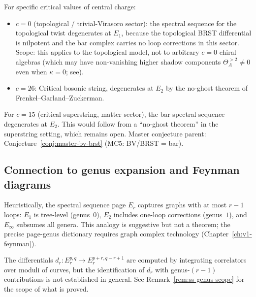 \begin{theorem}\label{thm:degeneration-special-c}
For specific critical values of central charge:
\begin{itemize}
\item $c = 0$ \textup{(topological / trivial-Virasoro sector)}: the spectral sequence
 for the topological twist degenerates at $E_1$, because the topological BRST
 differential is nilpotent and the bar complex carries no loop corrections in
 this sector. \textup{Scope}: this applies to the topological model, not to
 arbitrary $c=0$ chiral algebras (which may have non-vanishing higher shadow
 components $\Theta_A^{>2} \neq 0$ even when $\kappa = 0$; see).
\item $c = 26$: Critical bosonic string, degenerates at $E_2$ by the
 no-ghost theorem of Frenkel--Garland--Zuckerman.
\end{itemize}
\end{theorem}

\begin{conjecture}\label{conj:superstring-degeneration}
For $c = 15$ (critical superstring, matter sector), the bar spectral sequence degenerates at $E_2$. This would follow from a ``no-ghost theorem'' in the superstring setting, which remains open.
\textup{Master conjecture parent:}
Conjecture~\textup{\ref{conj:master-bv-brst}} \textup{(MC5: BV/BRST = bar).}
\end{conjecture}

\subsection{Connection to genus expansion and Feynman diagrams}

\begin{remark}\label{rem:ss-genus-spectral}
Heuristically, the spectral sequence page $E_r$ captures graphs with at most $r-1$ loops: $E_1$ is tree-level (genus~$0$), $E_2$ includes one-loop corrections (genus~$1$), and $E_\infty$ subsumes all genera. This analogy is suggestive but not a theorem; the precise page-genus dictionary requires graph complex technology (Chapter~\ref{ch:v1-feynman}).

The differentials $d_r \colon E_r^{p,q} \to E_r^{p+r,q-r+1}$ are computed by integrating correlators over moduli of curves, but the identification of $d_r$ with genus-$(r-1)$ contributions is not established in general. See Remark~\ref{rem:ss-genus-scope} for the scope of what is proved.
\end{remark}

